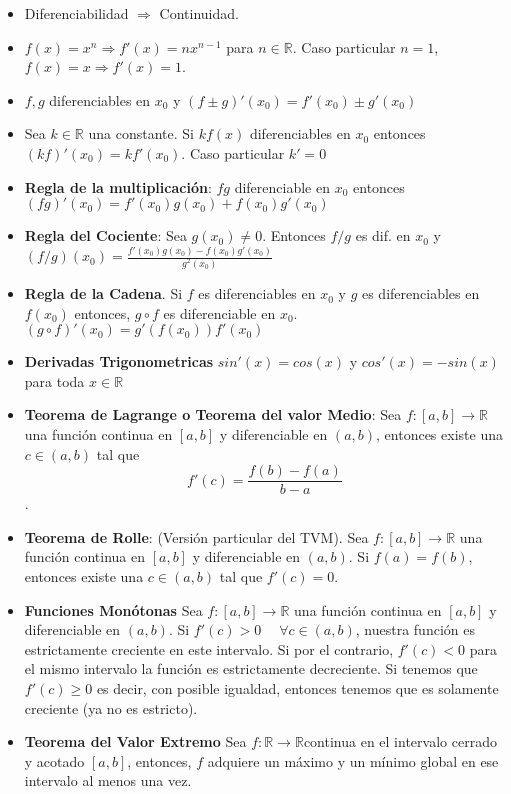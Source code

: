 \documentclass[pdftex,11pt,a4paper]{article}
\begin{document}
\begin{itemize}
    \item Diferenciabilidad $\Rightarrow$ Continuidad.
    \item $f(x) = x^n \Rightarrow f'(x) = nx^{n-1}$ para $n\in \mathbb{R}$. Caso particular $n = 1$, $f(x) = x \Rightarrow f'(x) = 1$.
    \item $f,g$ diferenciables en $x_0$ y $(f\pm g)'(x_0) = f'(x_0) \pm g'(x_0)$
    \item Sea $k \in \mathbb{R}$ una constante. Si $kf(x)$ diferenciables en $x_0$ entonces $(kf)'(x_0) = kf'(x_0)$. Caso particular $k' = 0$
    \item \textbf{Regla de la multiplicación}: $fg$ diferenciable en $x_0$ entonces $(fg)'(x_0) = f'(x_0)g(x_0) + f(x_0)g'(x_0)$
    \item \textbf{Regla del Cociente}: Sea $g(x_0) \neq 0 $. Entonces $f/g$ es dif. en $x_0$ y $(f/g)(x_0) = \frac{f'(x_0)g(x_0) - f(x_0)g'(x_0)}{g^2(x_0)}$
    \item \textbf{Regla de la Cadena}. Si $f$ es diferenciables en $x_0$ y $g$ es diferenciables en $f(x_0)$ entonces, $g\circ f$ es diferenciable en $x_0$. $(g\circ f)'(x_0) = g'(f(x_0))f'(x_0)$
    \item \textbf{Derivadas Trigonometricas} $sin'(x) = cos(x)$ y $cos'(x) = -sin(x)$ para toda $x\in \mathbb{R}$
    \item \textbf{Teorema de Lagrange o Teorema del valor Medio}: Sea $f:[a,b]\rightarrow \mathbb{R}$ una función continua en $[a,b]$ y diferenciable en $(a,b)$,  entonces existe una $c \in (a,b)$ tal que $$f'(c) = \dfrac{f(b) - f(a)}{b-a}$$.
    \item \textbf{Teorema de Rolle}: (Versión particular del TVM). Sea $f:[a,b]\rightarrow \mathbb{R}$ una función continua en $[a,b]$ y diferenciable en $(a,b)$. Si $f(a) = f(b)$, entonces existe una $c \in (a,b)$ tal que $f'(c) = 0$.
    \item \textbf{Funciones Monótonas} Sea $f:[a,b]\rightarrow \mathbb{R}$ una función continua en $[a,b]$ y diferenciable en $(a,b)$. Si $f'(c) > 0 \; \quad \forall c\in (a,b)$, nuestra función es estrictamente creciente en este intervalo. Si por el contrario, $f'(c) < 0$ para el mismo intervalo la función es estrictamente decreciente. Si tenemos que $f'(c)\geq 0$ es decir, con posible igualdad, entonces tenemos que es solamente creciente (ya no es estricto).
    \item \textbf{Teorema del Valor Extremo} Sea $f:\mathbb{R}\rightarrow \mathbb{R} $continua en el intervalo cerrado y acotado $[a,b]$, entonces, $f$ adquiere un máximo y un mínimo global en ese intervalo al menos una vez.

\end{itemize}
\end{document}
